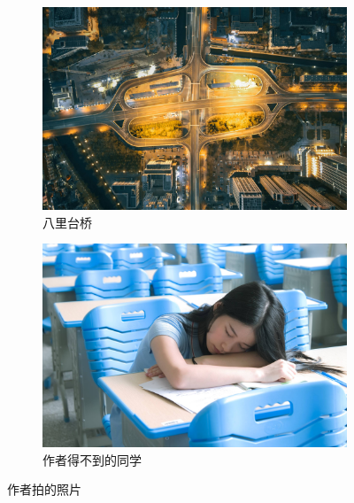 \documentclass[zihao = -4, linespread = 1.5]{ctexart}
\begin{document}
\begin{figure}[htbp]
     \begin{subfigure}[b]{.5\linewidth - 1mm}
         \centering
         \includegraphics[width=\textwidth]{picture/八里台桥.jpg}
         \caption{八里台桥}
         \label{fig:八里台桥}
     \end{subfigure}
     \hfill
     \begin{subfigure}[b]{.5\linewidth - 1mm}
         \centering
         \includegraphics[width=\textwidth]{picture/某同学.jpg}
         \caption{作者得不到的同学}
         \label{fig:某同学}
     \end{subfigure}
        \caption{作者拍的照片}
        \label{fig:photos}
\end{figure}



\clearpage
\end{document}
